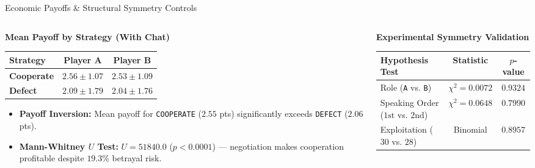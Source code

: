 \documentclass[aspectratio=169, 10pt]{beamer}
\begin{document}
\begin{frame}{Economic Payoffs \& Structural Symmetry Controls}
    \small
    \begin{columns}[T, totalwidth=\textwidth]
        \begin{column}{0.48\textwidth}
            \textbf{Mean Payoff by Strategy (With Chat)}
            \vspace{0.2cm}
            \footnotesize
            \begin{tabular}{lcc}
                \toprule
                \textbf{Strategy}  & \textbf{Player A} & \textbf{Player B} \\
                \midrule
                \textbf{Cooperate} & $2.56 \pm 1.07$   & $2.53 \pm 1.09$   \\
                \textbf{Defect}    & $2.09 \pm 1.79$   & $2.04 \pm 1.76$   \\
                \bottomrule
            \end{tabular}
            \vspace{0.25cm}
            \small
            \begin{itemize}
                \setlength{\itemsep}{6pt}
                \item \textbf{Payoff Inversion:} Mean payoff for \texttt{COOPERATE} ($2.55$ pts) significantly exceeds \texttt{DEFECT} ($2.06$ pts).
                \item \textbf{Mann-Whitney $U$ Test:} $U = 51840.0$ ($p < 0.0001$) --- negotiation makes cooperation profitable despite $19.3\%$ betrayal risk.
            \end{itemize}
        \end{column}
        \begin{column}{0.48\textwidth}
            \textbf{Experimental Symmetry Validation}
            \vspace{0.2cm}
            \footnotesize
            \begin{tabular}{lcc}
                \toprule
                \textbf{Hypothesis Test}                       & \textbf{Statistic} & \textbf{$p$-value} \\
                \midrule
                Role (\texttt{A} vs. \texttt{B})               & $\chi^2 = 0.0072$  & $0.9324$           \\
                Speaking Order ($1\text{st}$ vs. $2\text{nd}$) & $\chi^2 = 0.0648$  & $0.7990$           \\
                Exploitation ($30$ vs. $28$)                   & Binomial           & $0.8957$           \\

\end{tabular}
\end{column}
\end{columns}
\end{frame}
\end{document}
